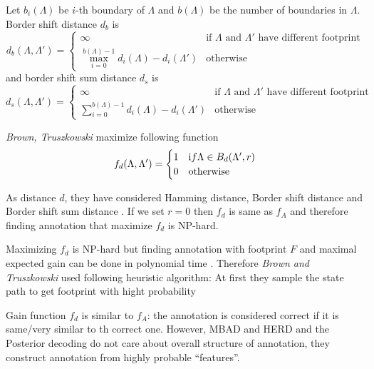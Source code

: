 \begin{definition}
Let $b_i(\Lambda)$ be $i$-th boundary of $\Lambda$ and $b(\Lambda)$ be the
number of boundaries in $\Lambda$.
Border shift distance $d_{b}$ is 
\begin{equation*}
d_{b}(\Lambda,\Lambda') = \begin{cases}
\infty & \text{if $\Lambda$ and $\Lambda'$ have different footprint}\\
\max_{i=0}^{b(\Lambda)-1} d_i(\Lambda)-d_i(\Lambda') & \text{otherwise}
\end{cases}
\end{equation*}
and border shift sum distance $d_s$ is 
\begin{equation*}
d_{s}(\Lambda,\Lambda') = \begin{cases}
\infty & \text{if $\Lambda$ and $\Lambda'$ have different footprint}\\
\sum_{i=0}^{b(\Lambda)-1} d_i(\Lambda)-d_i(\Lambda') & \text{otherwise}
\end{cases}
\end{equation*}

\end{definition}

{\it Brown,
Truszkowski} maximize following function
\begin{equation*}
f_d(\Lambda,\Lambda') = 
\begin{cases}
1 & {\text if }\Lambda\in B_d(\Lambda',r)\\
0 & \text{otherwise}
\end{cases}
\end{equation*}

As distance $d$, they have considered Hamming distance, Border shift distance
and Border shift sum distance \cite{Brown2010}.  If we set $r=0$ then $f_d$ is
same as $f_A$ and therefore finding annotation that maximize $f_d$ is NP-hard.

Maximizing $f_d$ is NP-hard but finding annotation with footprint $F$ and
maximal expected gain can be done in polynomial time \cite{Brown2010}. Therefore
{\it Brown and Truszkowski} used following heuristic algorithm: At first they
sample the state path to get footprint with hight probability

Gain function $f_d$ is similar to $f_A$: the annotation is considered correct if
it is same/very similar to th correct one. However, MBAD and HERD and the
Posterior decoding do not care about overall structure of annotation, they
construct annotation from highly probable ``features''.




